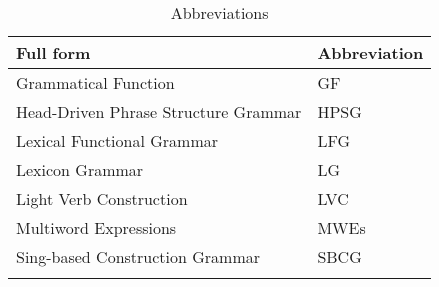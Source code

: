 \documentclass[output=paper]{langsci/langscibook}
\begin{document}
\begin{table}
\begin{tabular}{ll}
\lsptoprule
Full form  & Abbreviation \\
\midrule
Grammatical Function & GF \\
Head-Driven Phrase Structure Grammar & HPSG\\
Lexical Functional Grammar & LFG \\
Lexicon Grammar & LG \\
Light Verb Construction & LVC \\
Multiword Expressions & MWEs \\
Sing-based Construction Grammar & SBCG \\
\lspbottomrule
\end{tabular}
\caption{Abbreviations}
\end{table}

\printbibliography[heading=subbibliography,notkeyword=this]
\end{document}
